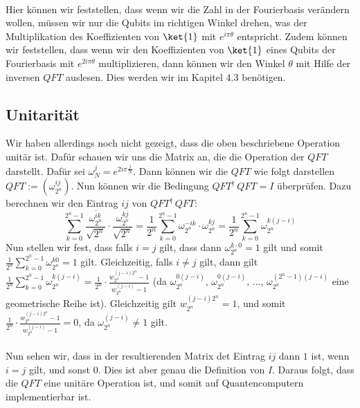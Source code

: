 \paragraph{}

\noindent Hier können wir feststellen, dass wenn wir die Zahl in der Fourierbasis verändern wollen, müssen wir nur die Qubits im richtigen Winkel drehen, was der Multiplikation des Koeffizienten von $\ket{1}$ mit $e^{i\pi\theta}$ entspricht. Zudem können wir feststellen, dass wenn wir den Koeffizienten von $\ket{1}$ eines Qubits der Fourierbasis mit $e^{2i\pi\theta}$ multiplizieren, dann können wir den Winkel $\theta$ mit Hilfe der inversen $QFT$ auslesen. Dies werden wir im Kapitel 4.3 benötigen.

\subsection{Unitarität}
Wir haben allerdings noch nicht gezeigt, dass die oben beschriebene Operation unitär ist. Dafür schauen wir uns die Matrix an, die die Operation der $QFT$ darstellt. Dafür sei $\omega_N^{j} = e^{2i\pi\frac{j}{N}}$. Dann können wir die $QFT$ wie folgt darstellen $QFT := (\omega_{2^n}^{ij})$. Nun können wir die Bedingung $QFT^{\dagger}\, QFT = I$ überprüfen. Dazu berechnen wir den Eintrag $ij$ von $QFT^{\dagger}\, QFT$:
$$\sum_{k = 0}^{2^n - 1}\frac{\overline{\omega_{2^n}^{ik}}}{\sqrt{2^n}} \cdot \frac{\omega_{2^n}^{kj}}{\sqrt{2^n}} = \frac{1}{2^n}\sum_{k = 0}^{2^n - 1}\omega_{2^n}^{-ik} \cdot \omega_{2^n}^{kj} = \frac{1}{2^n}\sum_{k = 0}^{2^n - 1}\omega_{2^n}^{k(j - i)}$$
Nun stellen wir fest, dass falls $i = j$ gilt, dass dann $\omega_{2^n}^{k\cdot 0} = 1$ gilt und somit $\frac{1}{2^n}\sum_{k = 0}^{2^n - 1}\omega_{2^n}^{k\dot 0} = 1$ gilt. Gleichzeitig, falls $i \not= j$ gilt, dann gilt $\frac{1}{2^n}\sum_{k = 0}^{2^n - 1}\omega_{2^n}^{k(j - i)} = \frac{1}{2^n} \cdot \frac{w_{2^n}^{(j - i)2^n} - 1}{w_{2^n}^{(j - i)} - 1}$ (da $\omega_{2^n}^{0(j - i)}$, $\omega_{2^n}^{0(j - i)}$, ..., $\omega_{2^n}^{(2^n - 1)(j - i)}$ eine geometrische Reihe ist). Gleichzeitig gilt $w_{2^n}^{(j - i)2^n} = 1$, und somit $\frac{1}{2^n} \cdot \frac{w_{2^n}^{(j - i)2^n} - 1}{w_{2^n}^{(j - i)} - 1} = 0$, da $\omega^{(j - i)}_{2^n} \not= 1$ gilt.

\paragraph{}

Nun sehen wir, dass in der resultierenden Matrix det Eintrag $ij$ dann $1$ ist, wenn $i = j$ gilt, und sonst $0$. Dies ist aber genau die Definition von $I$. Daraus folgt, dass die $QFT$ eine unitäre Operation ist, und somit auf Quantencomputern implementierbar ist.


